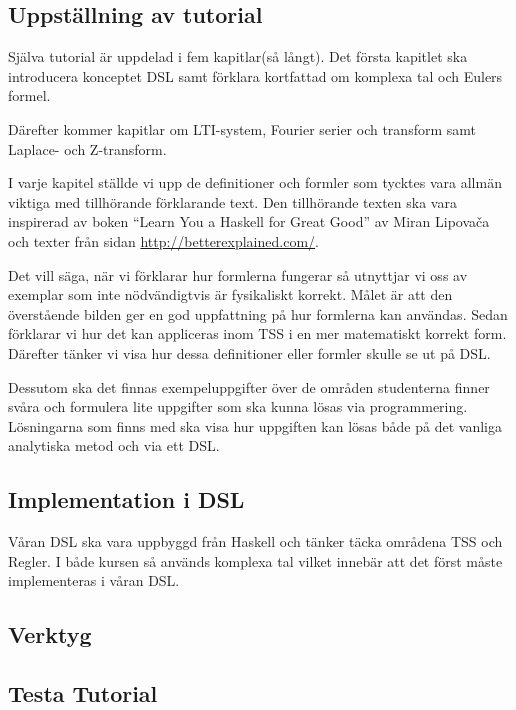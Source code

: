 \documentclass[]{article}
\begin{document}

\subsection{Uppställning av tutorial}

Själva tutorial är uppdelad i fem kapitlar(så långt). Det första kapitlet
ska introducera konceptet DSL samt förklara kortfattad om komplexa tal
och Eulers formel.

Därefter kommer kapitlar om LTI-system, Fourier serier och transform
samt Laplace- och Z-transform.

I varje kapitel ställde vi upp de definitioner och formler som tycktes
vara allmän viktiga med tillhörande förklarande text. Den tillhörande
texten ska vara inspirerad av boken ``Learn You a Haskell for Great
Good'' av Miran Lipovača \cite{learnyouahaskell} och texter från sidan
\url{http://betterexplained.com/}.

Det vill säga, när vi förklarar hur formlerna fungerar så utnyttjar vi 
oss av exemplar som inte nödvändigtvis är fysikaliskt korrekt. Målet är
att den överstående bilden ger en god uppfattning på hur formlerna kan användas. 
Sedan förklarar vi hur det kan appliceras inom TSS i en mer matematiskt korrekt form. 
Därefter tänker vi visa hur dessa definitioner eller formler skulle se ut på DSL.

Dessutom ska det finnas exempeluppgifter över de områden studenterna finner
svåra och formulera lite uppgifter som ska kunna lösas via programmering. 
Lösningarna som finns med ska visa hur uppgiften kan lösas både på det vanliga
analytiska metod och via ett DSL.

\subsection{Implementation i DSL}

Våran DSL ska vara uppbyggd från Haskell och tänker täcka områdena TSS och Regler. 
I både kursen så används komplexa tal vilket innebär att det först måste implementeras i våran DSL. 

\subsection{Verktyg}

\subsection{Testa Tutorial}
\end{document}
